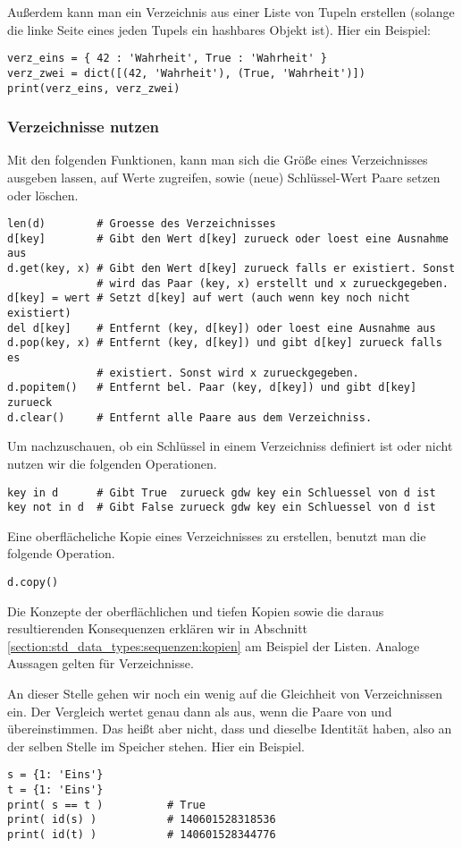 Außerdem kann man ein Verzeichnis aus einer Liste von Tupeln erstellen (solange die linke Seite eines jeden Tupels ein hashbares Objekt ist).
Hier ein Beispiel:
\begin{lstlisting}
verz_eins = { 42 : 'Wahrheit', True : 'Wahrheit' }
verz_zwei = dict([(42, 'Wahrheit'), (True, 'Wahrheit')])
print(verz_eins, verz_zwei)
\end{lstlisting}


\subsubsection{Verzeichnisse nutzen}
\label{section:std_data_types:verzeichnisse:verzeichnisse_nutzen}
Mit den folgenden Funktionen, kann man sich die Größe eines Verzeichnisses  ausgeben lassen,
auf Werte zugreifen, sowie (neue) Schlüssel-Wert Paare setzen oder löschen.
\begin{lstlisting}
len(d)        # Groesse des Verzeichnisses
d[key]        # Gibt den Wert d[key] zurueck oder loest eine Ausnahme aus
d.get(key, x) # Gibt den Wert d[key] zurueck falls er existiert. Sonst
              # wird das Paar (key, x) erstellt und x zurueckgegeben.
d[key] = wert # Setzt d[key] auf wert (auch wenn key noch nicht existiert)
del d[key]    # Entfernt (key, d[key]) oder loest eine Ausnahme aus
d.pop(key, x) # Entfernt (key, d[key]) und gibt d[key] zurueck falls es
              # existiert. Sonst wird x zurueckgegeben.
d.popitem()   # Entfernt bel. Paar (key, d[key]) und gibt d[key] zurueck
d.clear()     # Entfernt alle Paare aus dem Verzeichniss.
\end{lstlisting}
Um nachzuschauen, ob ein Schlüssel in einem Verzeichniss  definiert ist oder nicht nutzen wir die folgenden Operationen.
\begin{lstlisting}
key in d      # Gibt True  zurueck gdw key ein Schluessel von d ist
key not in d  # Gibt False zurueck gdw key ein Schluessel von d ist
\end{lstlisting}
Eine oberflächeliche Kopie eines Verzeichnisses  zu erstellen, benutzt man die folgende Operation.
\begin{lstlisting}
d.copy()
\end{lstlisting}
Die Konzepte der oberflächlichen und tiefen Kopien sowie die daraus resultierenden Konsequenzen erklären wir in Abschnitt \ref{section:std_data_types:sequenzen:kopien} am Beispiel der Listen.
Analoge Aussagen gelten für Verzeichnisse.

An dieser Stelle gehen wir noch ein wenig auf die Gleichheit von Verzeichnissen ein.
Der Vergleich  wertet genau dann als  aus, wenn die Paare von  und  übereinstimmen.
Das heißt aber nicht, dass  und  dieselbe Identität haben, also an der selben Stelle im Speicher stehen.
Hier ein Beispiel.
\begin{lstlisting}
s = {1: 'Eins'}
t = {1: 'Eins'}
print( s == t )          # True
print( id(s) )           # 140601528318536
print( id(t) )           # 140601528344776
\end{lstlisting}

